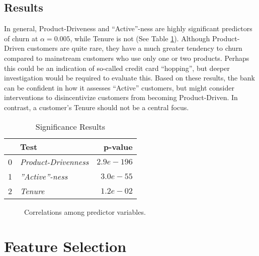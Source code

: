 \documentclass[twoside,twocolumn]{article}
\begin{document}
\subsection*{\large{Results}}
In general, Product-Driveness and “Active”-ness are highly significant predictors of churn at $\alpha = 0.005$, while Tenure is not (See Table \ref{table:significance}).  Although Product-Driven customers are quite rare, they have a much greater tendency to churn compared to mainstream customers who use only one or two products. Perhaps this could be an indication of so-called credit card “hopping”, but deeper investigation would be required to evaluate this. Based on these results, the bank can be confident in how it assesses “Active” customers, but might consider interventions to disincentivize customers from becoming Product-Driven. In contrast, a customer’s Tenure should not be a central focus.
\begin{table}
  \centering
  \caption{Significance Results}
  \begin{tabular}{llr}
    \toprule
    {} &                Test &        p-value \\
    \midrule
    0 &  \textit{Product-Drivenness} &  $2.9e-196$ \\
    1 &     \textit{''Active''-ness} &   $3.0e-55$ \\
    2 &              \textit{Tenure} &   $1.2e-02$ \\
    \bottomrule  
  \end{tabular}
  \label{table:significance}
\end{table}

\begin{figure}
  \begin{center}
    \resizebox{7cm}{!}{
      
    }
  \end{center}
  \caption{Correlations among predictor variables.}
\end{figure}

\section{Feature Selection}
\end{document}
